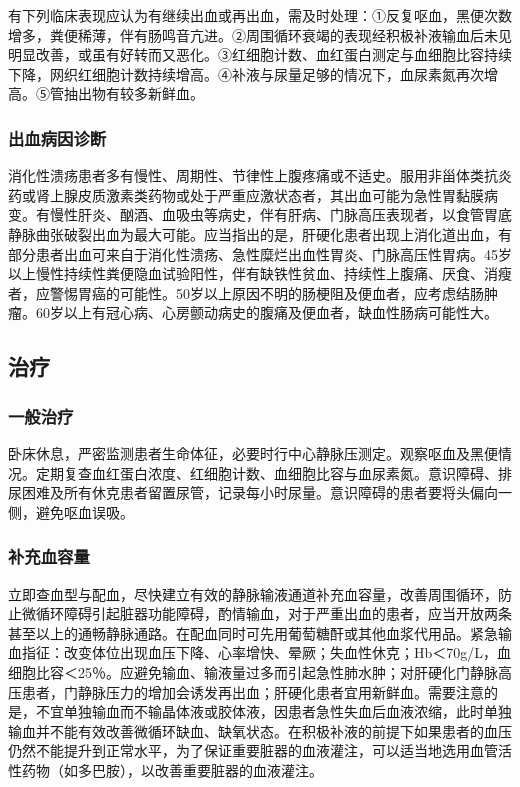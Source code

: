 有下列临床表现应认为有继续出血或再出血，需及时处理：①反复呕血，黑便次数增多，粪便稀薄，伴有肠鸣音亢进。②周围循环衰竭的表现经积极补液输血后未见明显改善，或虽有好转而又恶化。③红细胞计数、血红蛋白测定与血细胞比容持续下降，网织红细胞计数持续增高。④补液与尿量足够的情况下，血尿素氮再次增高。⑤管抽出物有较多新鲜血。

\subsubsection{出血病因诊断}

消化性溃疡患者多有慢性、周期性、节律性上腹疼痛或不适史。服用非甾体类抗炎药或肾上腺皮质激素类药物或处于严重应激状态者，其出血可能为急性胃黏膜病变。有慢性肝炎、酗酒、血吸虫等病史，伴有肝病、门脉高压表现者，以食管胃底静脉曲张破裂出血为最大可能。应当指出的是，肝硬化患者出现上消化道出血，有部分患者出血可来自于消化性溃疡、急性糜烂出血性胃炎、门脉高压性胃病。45岁以上慢性持续性粪便隐血试验阳性，伴有缺铁性贫血、持续性上腹痛、厌食、消瘦者，应警惕胃癌的可能性。50岁以上原因不明的肠梗阻及便血者，应考虑结肠肿瘤。60岁以上有冠心病、心房颤动病史的腹痛及便血者，缺血性肠病可能性大。

\subsection{治疗}

\subsubsection{一般治疗}

卧床休息，严密监测患者生命体征，必要时行中心静脉压测定。观察呕血及黑便情况。定期复查血红蛋白浓度、红细胞计数、血细胞比容与血尿素氮。意识障碍、排尿困难及所有休克患者留置尿管，记录每小时尿量。意识障碍的患者要将头偏向一侧，避免呕血误吸。

\subsubsection{补充血容量}

立即查血型与配血，尽快建立有效的静脉输液通道补充血容量，改善周围循环，防止微循环障碍引起脏器功能障碍，酌情输血，对于严重出血的患者，应当开放两条甚至以上的通畅静脉通路。在配血同时可先用葡萄糖酐或其他血浆代用品。紧急输血指征：改变体位出现血压下降、心率增快、晕厥；失血性休克；Hb＜70g/L，血细胞比容＜25％。应避免输血、输液量过多而引起急性肺水肿；对肝硬化门静脉高压患者，门静脉压力的增加会诱发再出血；肝硬化患者宜用新鲜血。需要注意的是，不宜单独输血而不输晶体液或胶体液，因患者急性失血后血液浓缩，此时单独输血并不能有效改善微循环缺血、缺氧状态。在积极补液的前提下如果患者的血压仍然不能提升到正常水平，为了保证重要脏器的血液灌注，可以适当地选用血管活性药物（如多巴胺），以改善重要脏器的血液灌注。

